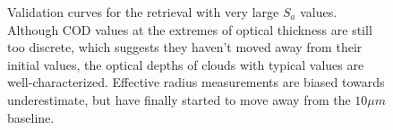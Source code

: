 \documentclass[12pt]{article}
\begin{document}
\begin{figure}[h!]
\begin{center}
{        }
    \end{center}
    \caption{Validation curves for the retrieval with very large $S_a$ values. Although COD values at the extremes of optical thickness are still too discrete, which suggests they haven't moved away from their initial values, the optical depths of clouds with typical values are well-characterized. Effective radius measurements are biased towards underestimate, but have finally started to move away from the $10\mu m$ baseline.}
    \label{big_sa_val}
\end{figure}

\begin{figure}[h!]
    \centering
    \begin{center}
\end{center}
\end{figure}
\end{document}
